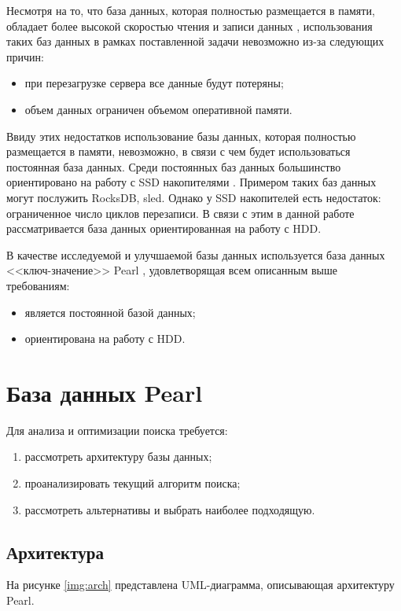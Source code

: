 Несмотря на то, что база данных, которая полностью размещается в памяти, обладает более высокой скоростью чтения и записи данных \cite{inmem}, использования таких баз данных в рамках поставленной задачи невозможно из-за следующих причин:
\begin{itemize}
    \item при перезагрузке сервера все данные будут потеряны;
    \item объем данных ограничен объемом оперативной памяти.
\end{itemize}

Ввиду этих недостатков использование базы данных, которая полностью размещается в памяти, невозможно, в связи с чем будет использоваться постоянная база данных. Среди постоянных баз данных большинство ориентировано на работу с SSD накопителями \cite{ssd}. Примером таких баз данных могут послужить RocksDB\cite{rocks}, sled\cite{sled}. Однако у SSD накопителей есть недостаток: ограниченное число циклов перезаписи. В связи с этим в данной работе рассматривается база данных ориентированная на работу с HDD\cite{hdd}.

В качестве исследуемой и улучшаемой базы данных используется база данных <<ключ-значение>> Pearl \cite{pearl}, удовлетворящая всем описанным выше требованиям:
\begin{itemize}
    \item является постоянной базой данных;
    \item ориентирована на работу с HDD.
\end{itemize}

\section{База данных Pearl}

Для анализа и оптимизации поиска требуется:
\begin{enumerate}
    \item рассмотреть архитектуру базы данных;
    \item проанализировать текущий алгоритм поиска;
    \item рассмотреть альтернативы и выбрать наиболее подходящую.
\end{enumerate}

\subsection{Архитектура}

На рисунке \ref{img:arch} представлена UML-диаграмма, описывающая архитектуру Pearl.

